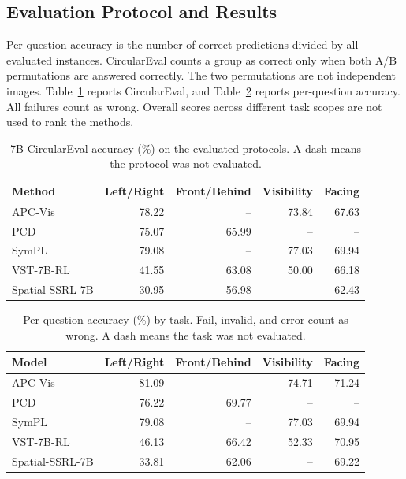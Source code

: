 \documentclass[runningheads]{llncs}
\begin{document}
\subsection{Evaluation Protocol and Results}

Per-question accuracy is the number of correct predictions divided by all evaluated instances. CircularEval counts a group as correct only when both A/B permutations are answered correctly. The two permutations are not independent images. Table~\ref{tab:3dsrbench-summary} reports CircularEval, and Table~\ref{tab:accuracy7b} reports per-question accuracy. All failures count as wrong. Overall scores across different task scopes are not used to rank the methods.

\begin{table}[t]
\centering\small
\setlength{\tabcolsep}{5pt}
\caption{7B CircularEval accuracy (\%) on the evaluated protocols. A dash means the protocol was not evaluated.}
\label{tab:3dsrbench-summary}
\begin{tabular}{@{}lrrrr@{}}
\toprule
Method & Left/Right & Front/Behind & Visibility & Facing \\
\midrule
APC-Vis & 78.22 & -- & 73.84 & 67.63 \\
PCD & 75.07 & 65.99 & -- & -- \\
SymPL & 79.08 & -- & 77.03 & 69.94 \\
VST-7B-RL & 41.55 & 63.08 & 50.00 & 66.18 \\
Spatial-SSRL-7B & 30.95 & 56.98 & -- & 62.43 \\
\bottomrule
\end{tabular}
\end{table}

\begin{table}[t]
\centering\small
\setlength{\tabcolsep}{5pt}
\caption{Per-question accuracy (\%) by task. Fail, invalid, and error count as wrong. A dash means the task was not evaluated.}
\label{tab:accuracy7b}
\begin{tabular}{@{}lrrrr@{}}
\toprule
Model & Left/Right & Front/Behind & Visibility & Facing \\
\midrule
APC-Vis & 81.09 & -- & 74.71 & 71.24 \\
PCD & 76.22 & 69.77 & -- & -- \\
SymPL & 79.08 & -- & 77.03 & 69.94 \\
VST-7B-RL & 46.13 & 66.42 & 52.33 & 70.95 \\
Spatial-SSRL-7B & 33.81 & 62.06 & -- & 69.22 \\
\bottomrule
\end{tabular}
\end{table}
\end{document}
